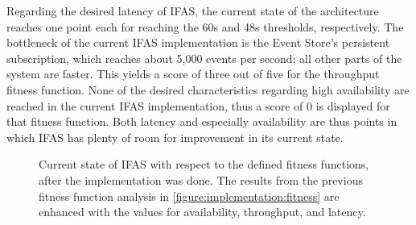 Regarding the desired latency of \ac{IFAS}, the current state of the architecture reaches one point each for reaching the 60s and 48s thresholds, respectively.
The bottleneck of the current \ac{IFAS} implementation is the Event Store's persistent subscription, which reaches about 5,000 events per second; all other parts of the system are faster.
This yields a score of three out of five for the throughput fitness function.
None of the desired characteristics regarding high availability are reached in the current \ac{IFAS} implementation, thus a score of 0 is displayed for that fitness function.
Both latency and especially availability are thus points in which \ac{IFAS} has plenty of room for improvement in its current state.

\begin{figure}[ht]
        \caption[Current state of \ac{IFAS} with respect to the defined fitness functions, after the evalatuion was done.]{
        Current state of \ac{IFAS} with respect to the defined fitness functions, after the implementation was done.
        The results from the previous fitness function analysis in \cref{figure:implementation:fitness} are enhanced with the values for availability, throughput, and latency.
        }
        \label{figure:evaluation:fitness}
\end{figure}
